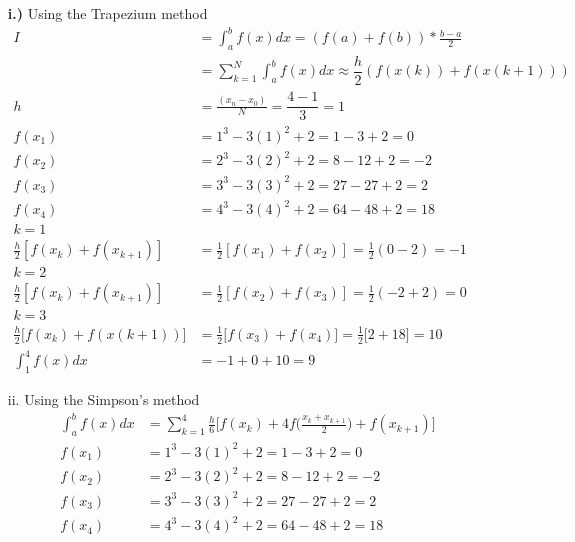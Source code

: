 \begin{itemize}
\item[\textbf{i.)}] Using the Trapezium method
\begin{align*}
I &=  \int_{a}^{b} f\left( x\right) dx = \left(f \left(a \right)+f\left( b\right) \right) * \frac{b-a}{2}\\
  &= \sum_{k=1}^{N}  \int_{a}^{b} f\left( x\right) dx \approx \dfrac{h}{2} \left(f(x(k)) + f(x(k+1))\right)\\
  h &= \frac{\left( x_{n} - x_{0}\right)}{N} = \dfrac{4-1}{3} = 1\\
f\left( x_{1}\right) &= 1^{3} - 3\left( 1\right)^{2} + 2 = 1 - 3 + 2 = 0\\
f\left( x_{2}\right) &= 2^{3} - 3\left( 2\right)^{2} + 2 = 8 - 12 + 2 = -2\\
f\left( x_{3}\right) &= 3^{3} - 3\left( 3\right)^{2} + 2 = 27 - 27 + 2 = 2\\
f\left( x_{4}\right) &= 4^{3} - 3\left( 4\right)^{2} + 2 = 64 - 48 + 2 = 18\\
k = 1\\
\frac{h}{2}\left[ f\left( x_{k}\right)    + f\left( x_{k+1}\right) \right] &= \frac{1}{2}\left[ f\left( x_{1}\right) + f\left( x_{2}\right) \right] = \frac{1}{2}\left( 0 - 2 \right) = -1 \\
k = 2\\
\frac{h}{2}\left[ f\left( x_{k}\right)    + f\left( x_{k+1}\right) \right] &= \frac{1}{2}\left[ f\left( x_{2}\right) + f\left( x_{3}\right) \right] = \frac{1}{2}\left( -2 + 2 \right) = 0 \\
k=3\\
\frac{h}{2} \big[ f(x_k)+ f(x(k+1))\big]&=\frac{1}{2}\big[ f(x_3)+f(x_4)\big]=\frac{1}{2}\big[ 2+18\big]=10\\
\int^4_1 f(x)dx &= -1+0+10=9
\end{align*}
\item[ii.] Using the Simpson's method
\begin{align*}
\int_a^b f(x)dx&=\sum \limits_{k=1}^{4} \frac{h}{6} \big [f(x_{k}) + 4f \big(\frac{x_{k}+x_{k+1}}{2}\big)+f(x_{k+1})\big]\\
f\left( x_{1}\right) &= 1^{3} - 3\left( 1\right)^{2} + 2 = 1 - 3 + 2 = 0\\
f\left( x_{2}\right) &= 2^{3} - 3\left( 2\right)^{2} + 2 = 8 - 12 + 2 = -2\\
f\left( x_{3}\right) &= 3^{3} - 3\left( 3\right)^{2} + 2 = 27 - 27 + 2 = 2\\
f\left( x_{4}\right) &= 4^{3} - 3\left( 4\right)^{2} + 2 = 64 - 48 + 2 = 18\\

\end{align*}
\end{itemize}
